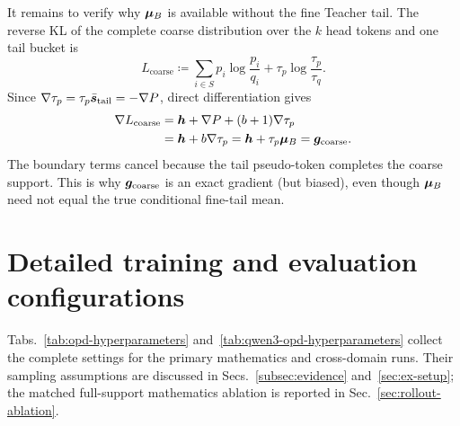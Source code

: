 It remains to verify why $\bm{\mu}_B$ is available without the fine Teacher
tail. The reverse KL of the complete coarse distribution over the $k$ head
tokens and one tail bucket is
\begin{equation}
 L_{\mathrm{coarse}}
 \coloneqq
 \sum_{i\in S}p_i\log\frac{p_i}{q_i}
 +\tau_p\log\frac{\tau_p}{\tau_q}.
\end{equation}
Since
$\nabla\tau_p=\tau_p\bar{\bm{s}}_{\mathrm{tail}}=-\nabla P$,
direct differentiation
gives
\begin{equation}
 \begin{aligned}
 \nabla L_{\mathrm{coarse}}
 &=\bm{h}+\nabla P+(b+1)\nabla\tau_p\\
 &=\bm{h}+b\nabla\tau_p
  =\bm{h}+\tau_p\bm{\mu}_B
  =\bm{g}_{\mathrm{coarse}}.
 \end{aligned}
\end{equation}
The boundary terms cancel because the tail pseudo-token completes the coarse
support. This is why $\bm{g}_{\mathrm{coarse}}$ is an exact gradient (but biased), even though
$\bm{\mu}_B$ need not equal the true conditional fine-tail mean.

\FloatBarrier
\section{Detailed training and evaluation configurations}
\label{app:hyperparameters}


Tabs.~\ref{tab:opd-hyperparameters} and~\ref{tab:qwen3-opd-hyperparameters}
collect the complete settings for the primary mathematics and cross-domain
runs. Their sampling assumptions are discussed in
Secs.~\ref{subsec:evidence} and~\ref{sec:ex-setup}; the matched
full-support mathematics ablation is reported in
Sec.~\ref{sec:rollout-ablation}.

